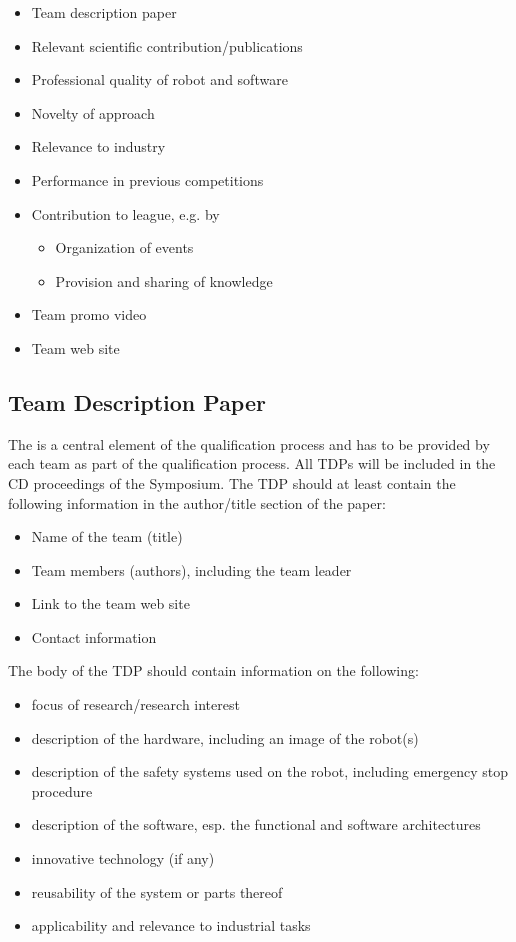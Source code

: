 \begin{itemize}

	\item Team description paper
	\item Relevant scientific contribution/publications
	\item Professional quality of robot and software
	\item Novelty of approach
	\item Relevance to industry
	\item Performance in previous competitions
	\item Contribution to \RCAW league, e.g. by
		\begin{itemize}
			\item Organization of events
			\item Provision and sharing of knowledge
		\end{itemize}
	\item Team promo video
	\item Team web site

\end{itemize}

\subsection{Team Description Paper}
The  is a central element of the qualification process and has to be provided by each team as part of the qualification process. All TDPs will be included in the CD proceedings of the \RC Symposium.
The TDP should at least contain the following information in the author/title section of the paper:

\begin{itemize}
	\item Name of the team (title)
	\item Team members (authors), including the team leader
	\item Link to the team web site
	\item Contact information
\end{itemize}


The body of the TDP should contain information on the following:

\begin{itemize}
	\item focus of research/research interest
	\item description of the hardware, including an image of the robot(s)
	\item description of the safety systems used on the robot, including emergency stop procedure
	\item description of the software, esp. the functional and software architectures
	\item innovative technology (if any)
	\item reusability of the system or parts thereof
	\item applicability and relevance to industrial tasks
\end{itemize}

